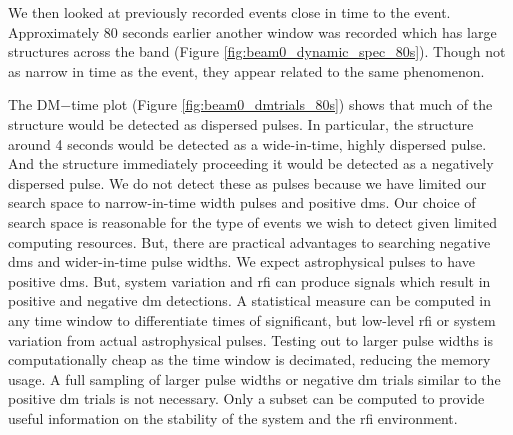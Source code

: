 \documentclass[a4paper,fleqn,usenatbib]{mnras}
\begin{document}
We then looked at previously recorded events close in time to the event.
Approximately 80 seconds earlier another window was recorded which has large
structures across the band (Figure \ref{fig:beam0_dynamic_spec_80s}). Though not
as narrow in time as the event, they appear related to the same phenomenon.

The DM$-$time plot (Figure \ref{fig:beam0_dmtrials_80s}) shows that much of the
structure would be detected as dispersed pulses.  In particular, the structure
around 4 seconds would be detected as a wide-in-time, highly dispersed pulse.
And the structure immediately proceeding it would be detected as a negatively
dispersed pulse.  We do not detect these as pulses because we have limited our
search space to narrow-in-time width pulses and positive \glspl{dm}. Our choice
of search space is reasonable for the type of events we wish to detect given
limited computing resources. But, there are practical advantages to searching
negative \glspl{dm} and wider-in-time pulse widths. We expect astrophysical
pulses to have positive \glspl{dm}. But, system variation and \gls{rfi} can
produce signals which result in positive and negative \gls{dm} detections.  A
statistical measure can be computed in any time window to differentiate times of
significant, but low-level \gls{rfi} or system variation from actual
astrophysical pulses. Testing out to larger pulse widths is computationally
cheap as the time window is decimated, reducing the memory usage. A full
sampling of larger pulse widths or negative \gls{dm} trials similar to the
positive \gls{dm} trials is not necessary. Only a subset can be computed to
provide useful information on the stability of the system and the \gls{rfi}
environment.
\end{document}
